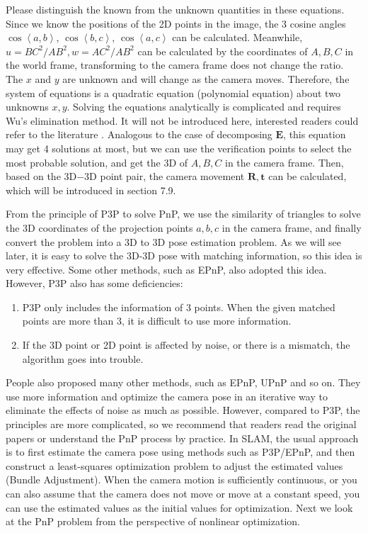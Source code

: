 Please distinguish the known from the unknown quantities in these equations. Since we know the positions of the 2D points in the image, the 3 cosine angles $\cos \left \langle a,b \right \rangle$, $\cos \left\langle b,c \right \rangle$, $\cos \left \langle a,c \right \rangle$ can be calculated. Meanwhile, $u=BC^2/AB^2, w=AC^2/AB^2$ can be calculated by the coordinates of $A, B, C$ in the world frame, transforming to the camera frame does not change the ratio. The $x$ and $y$ are unknown and will change as the camera moves. Therefore, the system of equations is a quadratic equation (polynomial equation) about two unknowns $x, y$. Solving the equations analytically is complicated and requires Wu's elimination method. It will not be introduced here, interested readers could refer to the literature \cite{GaoHouTangEtAl2003}. Analogous to the case of decomposing $\mathbf{E}$, this equation may get 4 solutions at most, but we can use the verification points to select the most probable solution, and get the 3D of $A, B, C$ in the camera frame. Then, based on the 3D−3D point pair, the camera movement $\mathbf{R}, \mathbf{t}$ can be calculated, which will be introduced in section 7.9.

From the principle of P3P to solve PnP, we use the similarity of triangles to solve the 3D coordinates of the projection points $a, b, c$ in the camera frame, and finally convert the problem into a 3D to 3D pose estimation problem. As we will see later, it is easy to solve the 3D-3D pose with matching information, so this idea is very effective. Some other methods, such as EPnP, also adopted this idea. However, P3P also has some deficiencies:

\begin{enumerate}
	\item P3P only includes the information of 3 points. When the given matched points are more than 3, it is difficult to use more information.
	\item If the 3D point or 2D point is affected by noise, or there is a mismatch, the algorithm goes into trouble.
\end{enumerate}

People also proposed many other methods, such as EPnP, UPnP and so on. They use more information and optimize the camera pose in an iterative way to eliminate the effects of noise as much as possible. However, compared to P3P, the principles are more complicated, so we recommend that readers read the original papers or understand the PnP process by practice. In SLAM, the usual approach is to first estimate the camera pose using methods such as P3P/EPnP, and then construct a least-squares optimization problem to adjust the estimated values (Bundle Adjustment). When the camera motion is sufficiently continuous, or you can also assume that the camera does not move or move at a constant speed, you can use the estimated values as the initial values for optimization. Next we look at the PnP problem from the perspective of nonlinear optimization.

